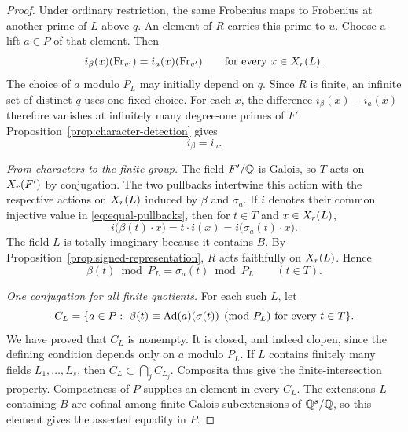 \begin{proof}
Under ordinary restriction, the same Frobenius maps to Frobenius at another prime of $L$ above $q$. An element of $R$ carries this prime to $u$. Choose a lift $a\in P$ of that element. Then
\[
 i_\beta(x)(\operatorname{Fr}_{v'})=i_a(x)(\operatorname{Fr}_{v'})
 \qquad\text{for every }x\in X_{r}(L).
\]
The choice of $a$ modulo $P_L$ may initially depend on $q$. Since $R$ is finite, an infinite set of distinct $q$ uses one fixed choice. For each $x$, the difference $i_\beta(x)-i_a(x)$ therefore vanishes at infinitely many degree-one primes of $F'$. Proposition~\ref{prop:character-detection} gives
\begin{equation}\label{eq:equal-pullbacks}
 i_\beta=i_a.
\end{equation}

\emph{From characters to the finite group.}
The field $F'/\mathbb Q$ is Galois, so $T$ acts on $X_{r}(F')$ by conjugation. The two pullbacks intertwine this action with the respective actions on $X_{r}(L)$ induced by $\beta$ and $\sigma_a$. If $i$ denotes their common injective value in \eqref{eq:equal-pullbacks}, then for $t\in T$ and $x\in X_{r}(L)$,
\[
 i\bigl(\beta(t)\cdot x\bigr)
   =t\cdot i(x)
   =i\bigl(\sigma_a(t)\cdot x\bigr).
\]
The field $L$ is totally imaginary because it contains $B$. By Proposition~\ref{prop:signed-representation}, $R$ acts faithfully on $X_{r}(L)$. Hence
\[
 \beta(t)\bmod P_L=\sigma_a(t)\bmod P_L\qquad(t\in T).
\]

\emph{One conjugation for all finite quotients.}
For each such $L$, let
\[
 C_L=\{a\in P:\ \beta(t)\equiv\Ad(a)(\sigma(t))\pmod{P_L}
                    \text{ for every }t\in T\}.
\]
We have proved that $C_L$ is nonempty. It is closed, and indeed clopen, since the defining condition depends only on $a$ modulo $P_L$. If $L$ contains finitely many fields $L_1,\ldots,L_s$, then $C_L\subset\bigcap_j C_{L_j}$. Composita thus give the finite-intersection property. Compactness of $P$ supplies an element in every $C_L$. The extensions $L$ containing $B$ are cofinal among finite Galois subextensions of $\mathbb Q^s/\mathbb Q$, so this element gives the asserted equality in $P$.
\end{proof}


